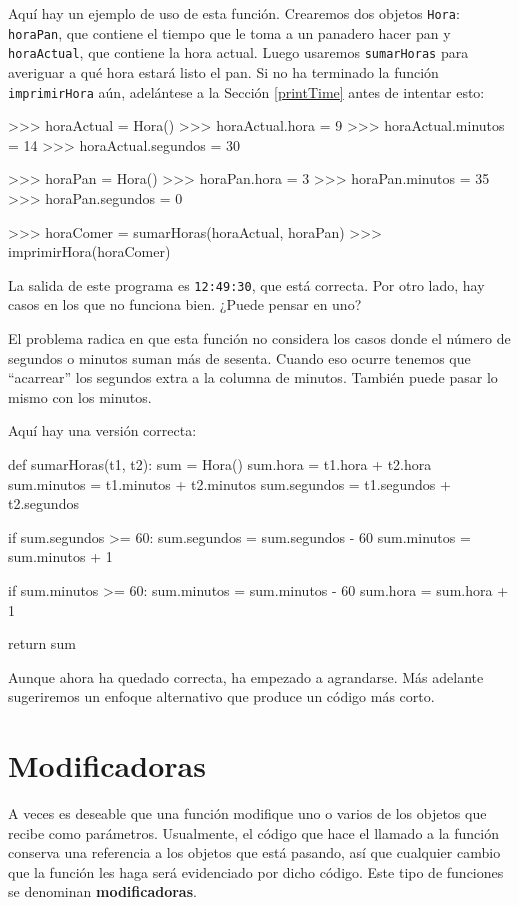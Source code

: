 Aquí hay un ejemplo de uso de esta función. Crearemos dos objetos
\texttt{Hora}: \texttt{horaPan}, que contiene el tiempo que le toma
a un panadero hacer pan y \texttt{horaActual}, que contiene la hora
actual. Luego usaremos \texttt{sumarHoras} para averiguar a qué hora
estará listo el pan. Si no ha terminado la función \texttt{imprimirHora}
aún, adelántese a la Sección \ref{printTime} antes de intentar esto:

\begin{pyconcode}
>>> horaActual = Hora()
>>> horaActual.hora = 9
>>> horaActual.minutos = 14
>>> horaActual.segundos =  30

>>> horaPan = Hora()
>>> horaPan.hora =  3
>>> horaPan.minutos =  35
>>> horaPan.segundos =  0

>>> horaComer = sumarHoras(horaActual, horaPan)
>>> imprimirHora(horaComer)
\end{pyconcode}
 La salida de este programa es \texttt{12:49:30}, que está correcta.
Por otro lado, hay casos en los que no funciona bien. ¿Puede pensar
en uno?

El problema radica en que esta función no considera los casos donde
el número de segundos o minutos suman más de sesenta. Cuando eso ocurre
tenemos que ``acarrear'' los segundos extra a la columna de minutos.
También puede pasar lo mismo con los minutos.

Aquí hay una versión correcta:
\begin{pythoncode}
def sumarHoras(t1, t2):
  sum = Hora()
  sum.hora = t1.hora + t2.hora
  sum.minutos = t1.minutos + t2.minutos
  sum.segundos = t1.segundos + t2.segundos

  if sum.segundos >= 60:
    sum.segundos = sum.segundos - 60
    sum.minutos = sum.minutos + 1

  if sum.minutos >= 60:
    sum.minutos = sum.minutos - 60
    sum.hora = sum.hora + 1

  return sum
\end{pythoncode}

Aunque ahora ha quedado correcta, ha empezado a agrandarse. Más adelante
sugeriremos un enfoque alternativo que produce un código más corto.

\section{Modificadoras}

\label{increment}  

A veces es deseable que una función modifique uno o varios de los
objetos que recibe como parámetros. Usualmente, el código que hace
el llamado a la función conserva una referencia a los objetos que
está pasando, así que cualquier cambio que la función les haga será
evidenciado por dicho código. Este tipo de funciones se denominan
\textbf{modificadoras}.

